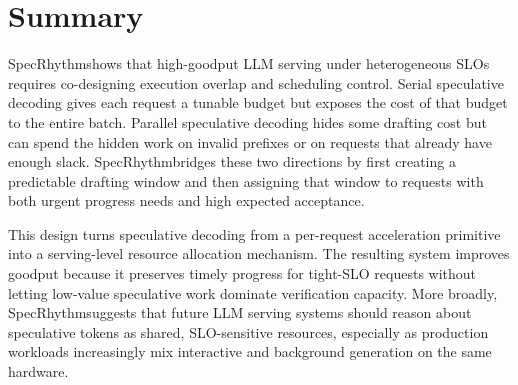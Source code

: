 \documentclass[sigplan,10pt,review,nonacm,anonymous]{acmart}
\newcommand{\system}{SpecRhythm}
\begin{document}
\section*{Summary}

\system shows that high-goodput LLM serving under heterogeneous SLOs requires co-designing execution overlap and scheduling control. Serial speculative decoding gives each request a tunable budget but exposes the cost of that budget to the entire batch. Parallel speculative decoding hides some drafting cost but can spend the hidden work on invalid prefixes or on requests that already have enough slack. \system bridges these two directions by first creating a predictable drafting window and then assigning that window to requests with both urgent progress needs and high expected acceptance.

This design turns speculative decoding from a per-request acceleration primitive into a serving-level resource allocation mechanism. The resulting system improves goodput because it preserves timely progress for tight-SLO requests without letting low-value speculative work dominate verification capacity. More broadly, \system suggests that future LLM serving systems should reason about speculative tokens as shared, SLO-sensitive resources, especially as production workloads increasingly mix interactive and background generation on the same hardware.

\clearpage
\end{document}
